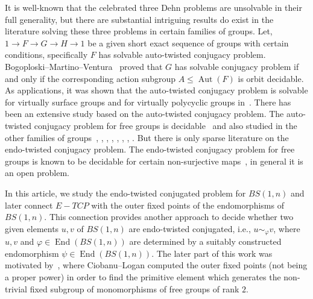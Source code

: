 \documentclass[a4paper]{amsart}
\theoremstyle{definition}
\newcommand{\Aut}{\operatorname{Aut}}
\newcommand{\End}{\operatorname{End}}
\begin{document}
It is well-known that the celebrated three Dehn problems are unsolvable in their full generality, but there are substantial intriguing results do exist in the literature solving these three problems in certain families of groups. Let, $1 \rightarrow F \rightarrow G \rightarrow H \rightarrow 1$ be a given short exact sequence of groups with certain conditions, specifically $F$ has solvable auto-twisted conjugacy problem. Bogoploski--Martino--Ventura~\cite{BMV} proved that $G$ has solvable conjugacy problem if and only if the corresponding action subgroup $A \leqslant \Aut(F)$ is orbit decidable. As applications, it was shown that the auto-twisted conjugacy problem is solvable for virtually surface groups and for virtually polycyclic groups in~\cite{BMV}.
There has been an extensive study based on the auto-twisted conjugacy problem. The auto-twisted conjugacy problem for free groups is decidable~\cite{BMMV} and also studied in the other families of groups~\cite{BV}, \cite{BuMV}, \cite{Cr}, \cite{Cr2}, \cite{FTV}, \cite{GM-V}, \cite{Macedo-Yuri}, \cite{Roy-Ventura-Mitra}. 
But there is only sparse literature on the endo-twisted conjugacy problem. The
endo-twisted conjugacy problem for free groups is known to be decidable for certain non-surjective maps~\cite{Kim16}, in general it is an open problem.

In this article, we study the endo-twisted conjugated problem for $BS(1,n)$ and later connect $E-TCP$ with the outer fixed points of the endomorphisms of $BS(1,n)$. This connection provides another approach to decide whether two given elements $u,v$ of $BS(1,n)$ are endo-twisted conjugated, i.e., $u \sim_\varphi v$, where $u, v$ and $\varphi \in \End(BS(1,n))$ are determined by a suitably constructed endomorphism $\psi \in \End(BS(1,n))$. The later part of this work was motivated by~\cite{Laura-Logan}, where Ciobanu--Logan computed the outer fixed points (not being a proper power) in order to find the primitive element which generates the non-trivial fixed subgroup of monomorphisms of free groups of rank $2$.

\end{document}
